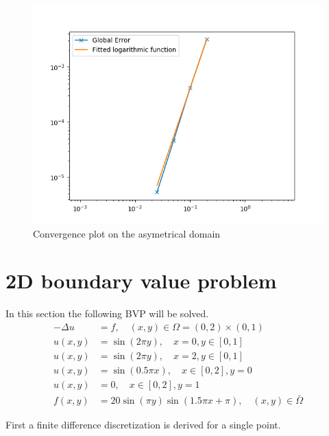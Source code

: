 \documentclass{article}
\begin{document}
\begin{figure}[H]
	\centering
	\includegraphics[width=.9\linewidth]{convergenceasym.png}
	\caption{Convergence plot on the asymetrical domain}
\end{figure}

\section{2D boundary value problem}
In this section the following BVP will be solved.
\begin{equation}
\begin{aligned}-\Delta u &=f, \quad(x, y) \in \Omega=(0,2) \times(0,1) \\ u(x, y) &=\sin (2 \pi y), \quad x=0, y \in[0,1] \\ u(x, y) &=\sin (2 \pi y), \quad x=2, y \in[0,1] \\ u(x, y) &=\sin (0.5 \pi x), \quad x \in[0,2], y=0 \\ u(x, y) &=0, \quad x \in[0,2], y=1 \\ f(x, y) &=20 \sin (\pi y) \sin (1.5 \pi x+\pi), \quad(x, y) \in \bar{\Omega} \end{aligned}
\end{equation}

First a finite difference discretization is derived for a single point.
\end{document}
